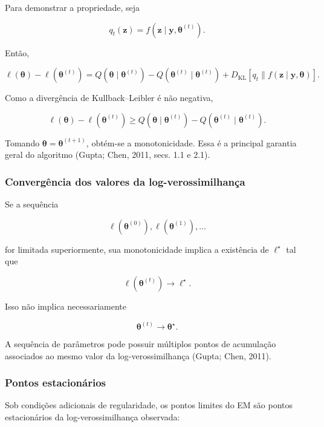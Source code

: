 \documentclass[
  letterpaper,
  DIV=11,
  numbers=noendperiod]{scrreprt}
\begin{document}
Para demonstrar a propriedade, seja

\[q_t(\boldsymbol{z})
=
f(\boldsymbol{z}\mid\boldsymbol{y},\boldsymbol{\theta}^{(t)}).\]

Então,

\[\ell(\boldsymbol{\theta})-\ell(\boldsymbol{\theta}^{(t)})
=Q(\boldsymbol{\theta}\mid\boldsymbol{\theta}^{(t)})
-Q(\boldsymbol{\theta}^{(t)}\mid\boldsymbol{\theta}^{(t)})
+D_{\mathrm{KL}}\left[q_t\parallel f(\boldsymbol{z}\mid\boldsymbol{y},\boldsymbol{\theta})
\right].\]

Como a divergência de Kullback--Leibler é não negativa,

\[\ell(\boldsymbol{\theta})-\ell(\boldsymbol{\theta}^{(t)})
\geq Q(\boldsymbol{\theta}\mid\boldsymbol{\theta}^{(t)}) -Q(\boldsymbol{\theta}^{(t)}\mid\boldsymbol{\theta}^{(t)}).\]

Tomando \(\boldsymbol{\theta}=\boldsymbol{\theta}^{(t+1)}\), obtém-se a
monotonicidade. Essa é a principal garantia geral do algoritmo (Gupta;
Chen, 2011, secs. 1.1 e 2.1).

\subsubsection{Convergência dos valores da
log-verossimilhança}\label{converguxeancia-dos-valores-da-log-verossimilhanuxe7a}

Se a sequência

\[\ell(\boldsymbol{\theta}^{(0)}),
\ell(\boldsymbol{\theta}^{(1)}),
\ldots\]

for limitada superiormente, sua monotonicidade implica a existência de
\(\ell^\star\) tal que

\[\ell(\boldsymbol{\theta}^{(t)})
\longrightarrow
\ell^\star.\]

Isso não implica necessariamente

\[\boldsymbol{\theta}^{(t)}
\longrightarrow
\boldsymbol{\theta}^\star.\]

A sequência de parâmetros pode possuir múltiplos pontos de acumulação
associados ao mesmo valor da log-verossimilhança (Gupta; Chen, 2011).

\subsubsection{Pontos estacionários}\label{pontos-estacionuxe1rios}

Sob condições adicionais de regularidade, os pontos limites do EM são
pontos estacionários da log-verossimilhança observada:
\end{document}
